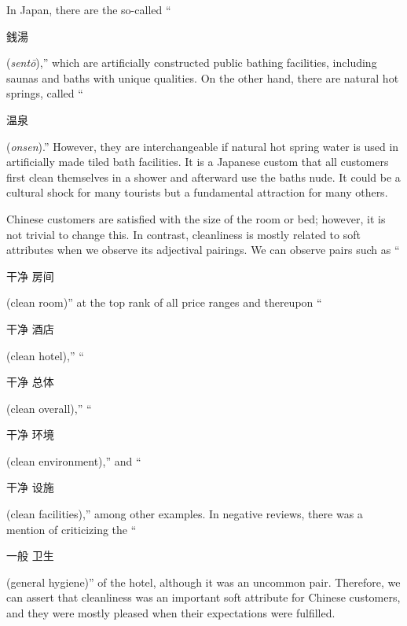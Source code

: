 \documentclass[smallextended,natbib]{svjour3}       %
\begin{document}
    In Japan, there are the so-called ``\begin{CJK}{UTF8}{min}銭湯\end{CJK} (\textit{sent\=o}),'' which are artificially constructed public bathing facilities, including saunas and baths with unique qualities. On the other hand, there are natural hot springs, called ``\begin{CJK}{UTF8}{gbsn}温泉\end{CJK} (\textit{onsen}).'' However, they are interchangeable if natural hot spring water is used in artificially made tiled bath facilities. It is a Japanese custom that all customers first clean themselves in a shower and afterward use the baths nude. It could be a cultural shock for many tourists but a fundamental attraction for many others. 

    Chinese customers are satisfied with the size of the room or bed; however, it is not trivial to change this. In contrast, cleanliness is mostly related to soft attributes when we observe its adjectival pairings. We can observe pairs such as ``\begin{CJK}{UTF8}{gbsn}干净 房间\end{CJK} (clean room)'' at the top rank of all price ranges and thereupon ``\begin{CJK}{UTF8}{gbsn}干净 酒店\end{CJK} (clean hotel),'' ``\begin{CJK}{UTF8}{gbsn}干净 总体\end{CJK} (clean overall),'' ``\begin{CJK}{UTF8}{gbsn}干净 环境\end{CJK} (clean environment),'' and ``\begin{CJK}{UTF8}{gbsn}干净 设施\end{CJK} (clean facilities),'' among other examples. In negative reviews, there was a mention of criticizing the ``\begin{CJK}{UTF8}{gbsn}一般 卫生\end{CJK} (general hygiene)'' of the hotel, although it was an uncommon pair. Therefore, we can assert that cleanliness was an important soft attribute for Chinese customers, and they were mostly pleased when their expectations were fulfilled. 
\end{document}

